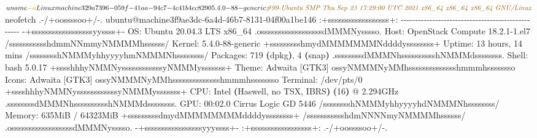 \documentclass[
  openany]{book}
\newenvironment{Shaded}{\begin{snugshade}}{\end{snugshade}}
\newcommand{\AttributeTok}[1]{\textcolor[rgb]{0.77,0.63,0.00}{#1}}
\newcommand{\BuiltInTok}[1]{#1}
\newcommand{\CommentTok}[1]{\textcolor[rgb]{0.56,0.35,0.01}{\textit{#1}}}
\newcommand{\ErrorTok}[1]{\textcolor[rgb]{0.64,0.00,0.00}{\textbf{#1}}}
\newcommand{\ExtensionTok}[1]{#1}
\newcommand{\KeywordTok}[1]{\textcolor[rgb]{0.13,0.29,0.53}{\textbf{#1}}}
\newcommand{\NormalTok}[1]{#1}
\begin{document}
\begin{Shaded}
\begin{Highlighting}[]
\ExtensionTok{$}\NormalTok{ uname }\AttributeTok{{-}a}
\ExtensionTok{Linux}\NormalTok{ machine329a7396{-}059f{-}41aa{-}94c7{-}4c41b4ec8290 5.4.0{-}88{-}generic }\CommentTok{\#99{-}Ubuntu SMP Thu Sep 23 17:29:00 UTC 2021 x86\_64 x86\_64 x86\_64 GNU/Linux}

\ExtensionTok{$}\NormalTok{ neofetch}
            \ExtensionTok{.{-}/+oossssoo+/{-}.}\NormalTok{               ubuntu@machine3f9ae3dc{-}6a4d{-}46b7{-}8131{-}04f00a1be146 }
        \KeywordTok{\textasciigrave{}}\BuiltInTok{:}\NormalTok{+ssssssssssssssssss+:}\KeywordTok{\textasciigrave{}}           \AttributeTok{{-}{-}{-}{-}{-}{-}{-}{-}{-}{-}{-}{-}{-}{-}{-}{-}{-}{-}{-}{-}{-}{-}{-}{-}{-}{-}{-}{-}{-}{-}{-}{-}{-}{-}{-}{-}{-}{-}{-}{-}{-}{-}{-}{-}{-}{-}{-}{-}{-}{-}} 
      \ExtensionTok{{-}+ssssssssssssssssssyyssss+{-}}\NormalTok{         OS: Ubuntu 20.04.3 LTS x86\_64 }
    \ExtensionTok{.ossssssssssssssssssdMMMNysssso.}\NormalTok{       Host: OpenStack Compute 18.2.1{-}1.el7 }
   \ExtensionTok{/ssssssssssshdmmNNmmyNMMMMhssssss/}\NormalTok{      Kernel: 5.4.0{-}88{-}generic }
  \ExtensionTok{+ssssssssshmydMMMMMMMNddddyssssssss+}\NormalTok{     Uptime: 13 hours, 14 mins }
 \ExtensionTok{/sssssssshNMMMyhhyyyyhmNMMMNhssssssss/}\NormalTok{    Packages: 719 }\ErrorTok{(}\ExtensionTok{dpkg}\KeywordTok{)}\ExtensionTok{,}\NormalTok{ 4 }\ErrorTok{(}\ExtensionTok{snap}\KeywordTok{)} 
\ExtensionTok{.ssssssssdMMMNhsssssssssshNMMMdssssssss.}\NormalTok{   Shell: bash 5.0.17 }
\ExtensionTok{+sssshhhyNMMNyssssssssssssyNMMMysssssss+}\NormalTok{   Theme: Adwaita [GTK3] }
\ExtensionTok{ossyNMMMNyMMhsssssssssssssshmmmhssssssso}\NormalTok{   Icons: Adwaita [GTK3] }
\ExtensionTok{ossyNMMMNyMMhsssssssssssssshmmmhssssssso}\NormalTok{   Terminal: /dev/pts/0 }
\ExtensionTok{+sssshhhyNMMNyssssssssssssyNMMMysssssss+}\NormalTok{   CPU: Intel }\ErrorTok{(}\ExtensionTok{Haswell,}\NormalTok{ no TSX, IBRS}\KeywordTok{)} \KeywordTok{(}\ExtensionTok{16}\KeywordTok{)} \ExtensionTok{@}\NormalTok{ 2.294GHz }
\ExtensionTok{.ssssssssdMMMNhsssssssssshNMMMdssssssss.}\NormalTok{   GPU: 00:02.0 Cirrus Logic GD 5446 }
 \ExtensionTok{/sssssssshNMMMyhhyyyyhdNMMMNhssssssss/}\NormalTok{    Memory: 635MiB / 64323MiB }
  \ExtensionTok{+sssssssssdmydMMMMMMMMddddyssssssss+}
   \ExtensionTok{/ssssssssssshdmNNNNmyNMMMMhssssss/}                              
    \ExtensionTok{.ossssssssssssssssssdMMMNysssso.}                               
      \ExtensionTok{{-}+sssssssssssssssssyyyssss+{-}}
        \KeywordTok{\textasciigrave{}}\BuiltInTok{:}\NormalTok{+ssssssssssssssssss+:}\KeywordTok{\textasciigrave{}}
            \ExtensionTok{.{-}/+oossssoo+/{-}.}
\end{Highlighting}
\end{Shaded}
\end{document}
